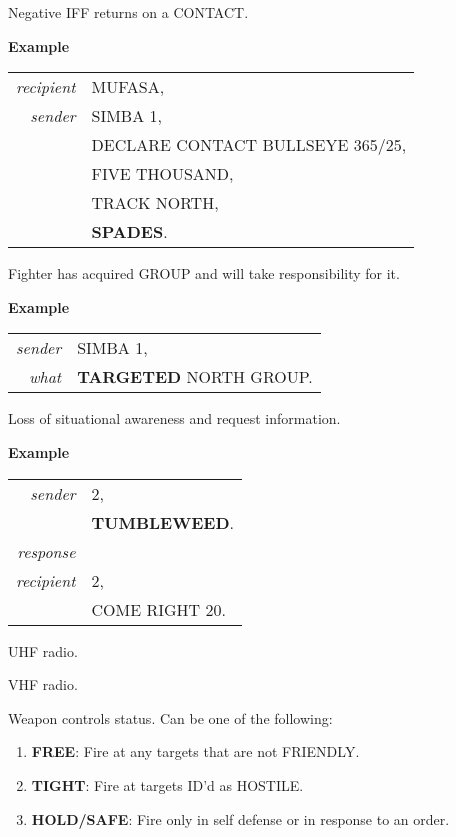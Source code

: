 \begin{tcoloritemize}
    \blueitem[SPADES]
    Negative IFF returns on a CONTACT.

    \medskip
    \textbf{Example}
    \begin{center}
        \begin{tabular}{>{\itshape}r l}
            recipient &  MUFASA, \\
            sender & SIMBA 1, \\
            & DECLARE CONTACT BULLSEYE 365/25, \\
            & FIVE THOUSAND, \\
            & TRACK NORTH, \\
            & \textbf{SPADES}. \\
        \end{tabular}
    \end{center}

    \blueitem[TARGETED]
    Fighter has acquired GROUP and will take responsibility for it.

    \medskip
    \textbf{Example}
    \begin{center}
        \begin{tabular}{>{\itshape}r l}
            sender &  SIMBA 1, \\
            what  & \textbf{TARGETED} NORTH GROUP. \\
        \end{tabular}
    \end{center}

    \blueitem[TUMBLEWEED]
    Loss of situational awareness and request information.

    \medskip
    \textbf{Example}
    \begin{center}
        \begin{tabular}{>{\itshape}r l}
            sender & 2, \\
            & \textbf{TUMBLEWEED}. \\
            response \\
            recipient & 2, \\
            & COME RIGHT 20. \\
        \end{tabular}
    \end{center}

    \blueitem[UNIFORM]
    UHF radio.

    \blueitem[VICTOR]
    VHF radio.

    Weapon controls status. Can be one of the following:\\
    \begin{enumerate}
        \item \label{FREE} \textbf{FREE}: Fire at any targets that are not FRIENDLY.
        \item \label{TIGHT} \textbf{TIGHT}: Fire at targets ID'd as HOSTILE.
        \item \label{HOLD} \textbf{HOLD/SAFE}: Fire only in self defense or in response to an order.
    \end{enumerate}


\end{tcoloritemize}
